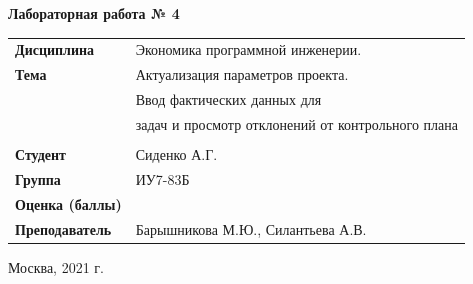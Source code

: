 \documentclass[a4paper,14pt]{extreport} %
\begin{document}
\begin{titlepage}
    \vspace{2cm}

    \begin{center}
        \textbf{Лабораторная работа № 4} \\
        \vspace{0.5cm}
    \end{center}

    \vspace{4cm}

    \begin{flushleft}
        \begin{tabular}{ll}
            \textbf{Дисциплина} & Экономика программной инженерии.  \\
            \textbf{Тема} & Актуализация параметров проекта. \\
            & Ввод фактических данных для \\
            & задач и просмотр отклонений от контрольного плана \\
            \\
            \textbf{Студент} & Сиденко А.Г. \\
            \textbf{Группа} & ИУ7-83Б \\
            \textbf{Оценка (баллы)} & \\
            \textbf{Преподаватель} & Барышникова М.Ю., Силантьева А.В.   \\
        \end{tabular}
    \end{flushleft}

    \vspace{4cm}

   \begin{center}
        Москва, 2021 г.
    \end{center}

\end{titlepage}
\end{document}
